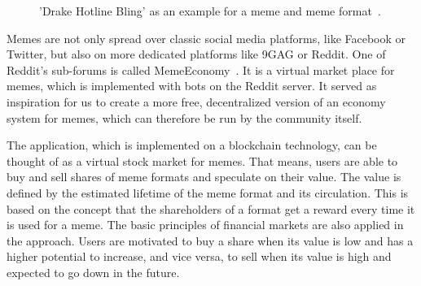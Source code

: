 \documentclass[12pt]{article}
\begin{document}
    \begin{figure}[H]
        \centering
        \caption{'Drake Hotline Bling' as an example for a meme and meme format~\cite{ImgflipMemes}.}
        \label{fig:meme_memeformat}
    \end{figure}

    Memes are not only spread over classic social media platforms, like Facebook or Twitter, but also on more dedicated platforms like 9GAG or Reddit. One of Reddit's sub-forums is called MemeEconomy~\cite{MemeEconReddit}. It is a virtual market place for memes, which is implemented with bots on the Reddit server. It served as inspiration for us to create a more free, decentralized version of an economy system for memes, which can therefore be run by the community itself.
    
    The application, which is implemented on a blockchain technology, can be thought of as a virtual stock market for memes. That means, users are able to buy and sell shares of meme formats and speculate on their value. The value is defined by the estimated lifetime of the meme format and its circulation. This is based on the concept that the shareholders of a format get a reward every time it is used for a meme. The basic principles of financial markets are also applied in the approach. Users are motivated to buy a share when its value is low and has a higher potential to increase, and vice versa, to sell when its value is high and expected to go down in the future.
    
\end{document}
